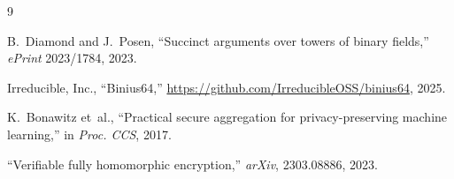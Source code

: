 \documentclass[11pt]{article}
\begin{document}

\begin{thebibliography}{9}

B.~Diamond and J.~Posen, ``Succinct arguments over towers of binary fields,'' \emph{ePrint} 2023/1784, 2023.

Irreducible, Inc., ``Binius64,'' \url{https://github.com/IrreducibleOSS/binius64}, 2025.

K.~Bonawitz et~al., ``Practical secure aggregation for privacy-preserving machine learning,'' in \emph{Proc. CCS}, 2017.

``Verifiable fully homomorphic encryption,'' \emph{arXiv}, 2303.08886, 2023.

\end{thebibliography}
\end{document}
